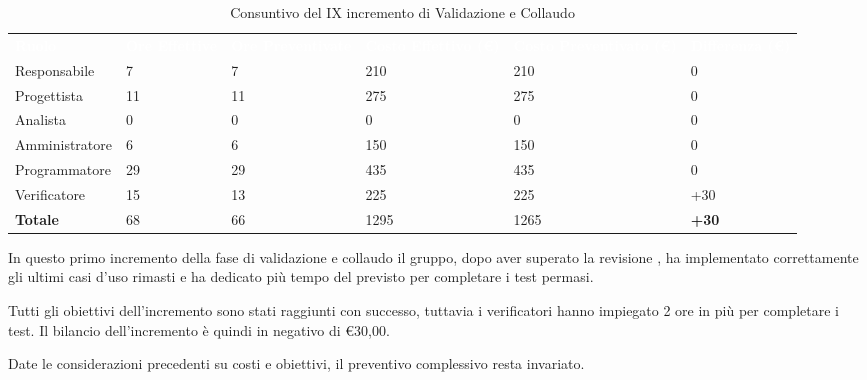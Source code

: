 \begin{table}[H]
\begin{center}
\renewcommand{\arraystretch}{1.5}
\begin{tabular}{ m{}<{\centering}  m{}<{\centering} m{}<{\centering} m{}<{\centering} m{}<{\centering} m{}<{\centering}}
	\rowcolor{darkblue}
	\textcolor{white}{\textbf{Ruolo}} & \textcolor{white}{\textbf{Ore Effettive}} & \textcolor{white}{\textbf{Ore Preventivate}}&\textcolor{white}{\textbf{Costo Effettivo (\euro)}}&\textcolor{white}{\textbf{Costo Preventivato (\euro)}}&\textcolor{white}{\textbf{Differenza (\euro)}}\\ 

	Responsabile  & 7 & 7 & 210 & 210 & 0\\	
	
	Progettista & 11 & 11 & 275 & 275 & 0\\
	
	Analista & 0 & 0 & 0 & 0 & 0\\
	
	Amministratore & 6 & 6 & 150 & 150 & 0\\
	
	Programmatore & 29 & 29 & 435 & 435 & 0\\
	
	Verificatore & 15 & 13 & 225 & 225 & +30\\
	
	\textbf{Totale} & 68 & 66 & 1295 & 1265 & \textbf{+30} \\
	
\end{tabular}
\caption{Consuntivo del IX incremento di Validazione e Collaudo}
\end{center}
\end{table}

In questo primo incremento della fase di validazione e collaudo il gruppo, dopo aver superato la revisione \PB{}, ha implementato correttamente gli ultimi casi d'uso rimasti e ha dedicato più tempo del previsto per completare i test permasi.

Tutti gli obiettivi dell’incremento sono stati raggiunti con successo, tuttavia i verificatori hanno impiegato 2 ore in più per completare i test. Il bilancio dell’incremento è quindi in negativo di \euro30,00. 

Date le considerazioni precedenti su costi e obiettivi, il preventivo complessivo resta invariato.

